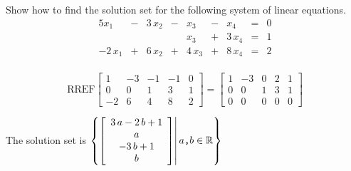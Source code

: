 
\begin{exerciseStatement}


Show how to find the solution set for the following system of linear equations. 
\begin{alignat*}{5} x_{1} &-& 3 \, x_{2} &-& x_{3} &-& x_{4} &=& 0 \\ & &  & & x_{3} &+& 3 \, x_{4} &=& 1 \\-2 \, x_{1} &+& 6 \, x_{2} &+& 4 \, x_{3} &+& 8 \, x_{4} &=& 2 \\ \end{alignat*}
            


\end{exerciseStatement}
    
\begin{exerciseAnswer} 
\[\mathrm{RREF} \left[\begin{array}{cccc|c}
1 & -3 & -1 & -1 & 0 \\
0 & 0 & 1 & 3 & 1 \\
-2 & 6 & 4 & 8 & 2
\end{array}\right]  =  \left[\begin{array}{cccc|c}
1 & -3 & 0 & 2 & 1 \\
0 & 0 & 1 & 3 & 1 \\
0 & 0 & 0 & 0 & 0
\end{array}\right] \]

The solution set is \( \left\{ \left[\begin{array}{c}
3 \, a - 2 \, b + 1 \\
a \\
-3 \, b + 1 \\
b
\end{array}\right] \middle|\,a\text{\texttt{,}}b\in\mathbb{R}\right\} \)


\end{exerciseAnswer}
    
